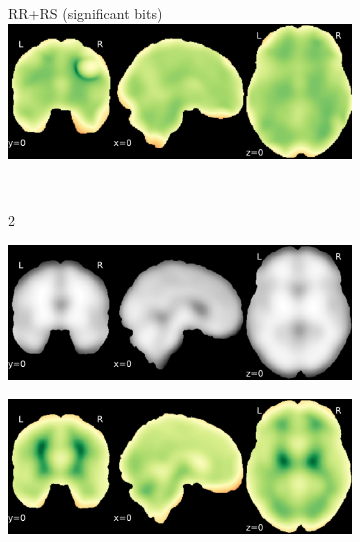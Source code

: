 \documentclass{article}
\begin{document}
\begin{appendices}
\begin{landscape}
\begin{figure}
\begin{subfigure}[t]{0.2\paperheight}
            \end{subfigure}
            \begin{subfigure}[t]{0.2\paperheight}
                \centering
                RR+RS (significant bits)
                \includegraphics[width=\textwidth]{figures/sig/20mm/rs_ds001600_sub-1_sig.pdf}
            \end{subfigure} \\
            \begin{subfigure}[b][][c]{0.01\paperwidth} 2 \vspace*{15pt} \end{subfigure}
            \begin{subfigure}[t]{0.2\paperheight}
                \centering
                \includegraphics[width=\textwidth]{figures/sig/20mm/ieee_ds001771_sub-36.pdf}
            \end{subfigure}
            \begin{subfigure}[t]{0.2\paperheight}
                \centering
                \includegraphics[width=\textwidth]{figures/sig/20mm/rr_ds001771_sub-36_sig.pdf}

\end{subfigure}
\end{figure}
\end{landscape}
\end{appendices}
\end{document}
